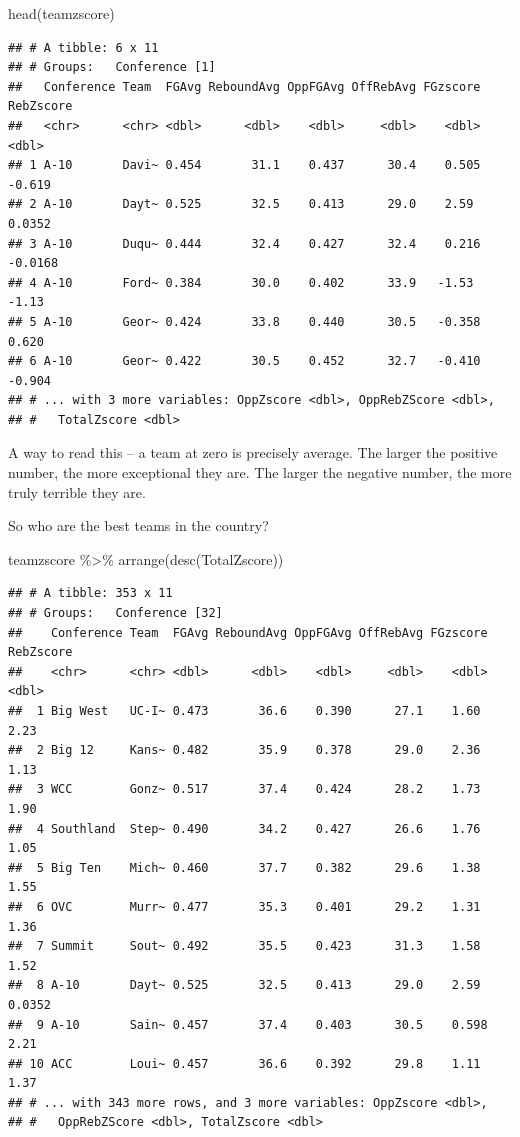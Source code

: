 \documentclass[
]{book}
\newenvironment{Shaded}{\begin{snugshade}}{\end{snugshade}}
\newcommand{\FunctionTok}[1]{\textcolor[rgb]{0.00,0.00,0.00}{#1}}
\newcommand{\NormalTok}[1]{#1}
\newcommand{\SpecialCharTok}[1]{\textcolor[rgb]{0.00,0.00,0.00}{#1}}
\begin{document}
\begin{Shaded}
\begin{Highlighting}[]
\FunctionTok{head}\NormalTok{(teamzscore)}
\end{Highlighting}
\end{Shaded}

\begin{verbatim}
## # A tibble: 6 x 11
## # Groups:   Conference [1]
##   Conference Team  FGAvg ReboundAvg OppFGAvg OffRebAvg FGzscore RebZscore
##   <chr>      <chr> <dbl>      <dbl>    <dbl>     <dbl>    <dbl>     <dbl>
## 1 A-10       Davi~ 0.454       31.1    0.437      30.4    0.505   -0.619 
## 2 A-10       Dayt~ 0.525       32.5    0.413      29.0    2.59     0.0352
## 3 A-10       Duqu~ 0.444       32.4    0.427      32.4    0.216   -0.0168
## 4 A-10       Ford~ 0.384       30.0    0.402      33.9   -1.53    -1.13  
## 5 A-10       Geor~ 0.424       33.8    0.440      30.5   -0.358    0.620 
## 6 A-10       Geor~ 0.422       30.5    0.452      32.7   -0.410   -0.904 
## # ... with 3 more variables: OppZscore <dbl>, OppRebZScore <dbl>,
## #   TotalZscore <dbl>
\end{verbatim}

A way to read this -- a team at zero is precisely average. The larger the positive number, the more exceptional they are. The larger the negative number, the more truly terrible they are.

So who are the best teams in the country?

\begin{Shaded}
\begin{Highlighting}[]
\NormalTok{teamzscore }\SpecialCharTok{\%\textgreater{}\%} \FunctionTok{arrange}\NormalTok{(}\FunctionTok{desc}\NormalTok{(TotalZscore))}
\end{Highlighting}
\end{Shaded}

\begin{verbatim}
## # A tibble: 353 x 11
## # Groups:   Conference [32]
##    Conference Team  FGAvg ReboundAvg OppFGAvg OffRebAvg FGzscore RebZscore
##    <chr>      <chr> <dbl>      <dbl>    <dbl>     <dbl>    <dbl>     <dbl>
##  1 Big West   UC-I~ 0.473       36.6    0.390      27.1    1.60     2.23  
##  2 Big 12     Kans~ 0.482       35.9    0.378      29.0    2.36     1.13  
##  3 WCC        Gonz~ 0.517       37.4    0.424      28.2    1.73     1.90  
##  4 Southland  Step~ 0.490       34.2    0.427      26.6    1.76     1.05  
##  5 Big Ten    Mich~ 0.460       37.7    0.382      29.6    1.38     1.55  
##  6 OVC        Murr~ 0.477       35.3    0.401      29.2    1.31     1.36  
##  7 Summit     Sout~ 0.492       35.5    0.423      31.3    1.58     1.52  
##  8 A-10       Dayt~ 0.525       32.5    0.413      29.0    2.59     0.0352
##  9 A-10       Sain~ 0.457       37.4    0.403      30.5    0.598    2.21  
## 10 ACC        Loui~ 0.457       36.6    0.392      29.8    1.11     1.37  
## # ... with 343 more rows, and 3 more variables: OppZscore <dbl>,
## #   OppRebZScore <dbl>, TotalZscore <dbl>
\end{verbatim}
\end{document}
